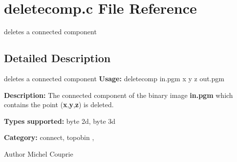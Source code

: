 \section{deletecomp.c File Reference}
\label{deletecomp_8c}


deletes a connected component  




\subsection{Detailed Description}
deletes a connected component {\bfseries Usage:} deletecomp in.pgm x y z out.pgm

{\bfseries Description:} The connected component of the binary image {\bfseries in.pgm} which contains the point ({\bfseries x},{\bfseries y},{\bfseries z}) is deleted.

{\bfseries Types supported:} byte 2d, byte 3d

{\bfseries Category:} connect, topobin ,

\begin{DoxyAuthor}{Author}
Michel Couprie 
\end{DoxyAuthor}

